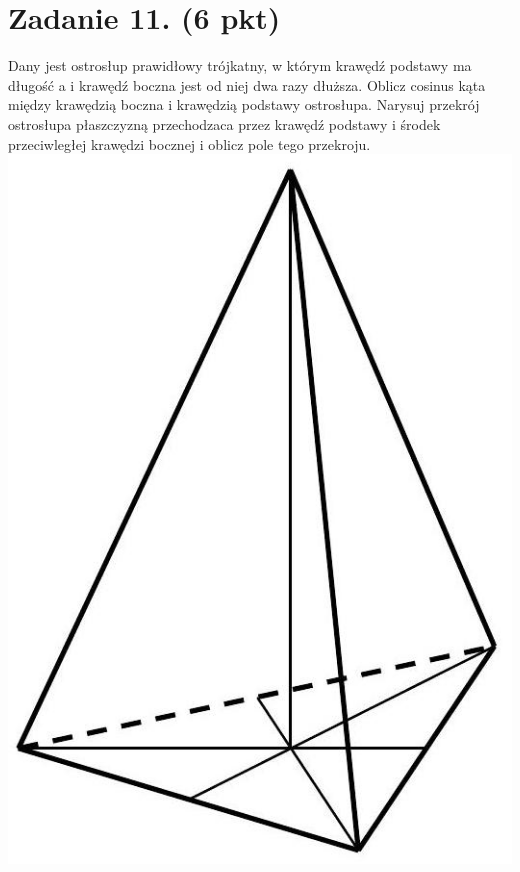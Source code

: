 \documentclass[10pt]{article}
\begin{document}
\section*{Zadanie 11. (6 pkt)}
Dany jest ostrosłup prawidłowy trójkatny, w którym krawędź podstawy ma długość a i krawędź boczna jest od niej dwa razy dłuższa. Oblicz cosinus kąta między krawędzią boczna i krawędzią podstawy ostrosłupa. Narysuj przekrój ostrosłupa płaszczyzną przechodzaca przez krawędź podstawy i środek przeciwległej krawędzi bocznej i oblicz pole tego przekroju.\\
\includegraphics[max width=\textwidth, center]{2024_11_21_8bf32a7596bd08ca7a9fg-14}\\
\end{document}
